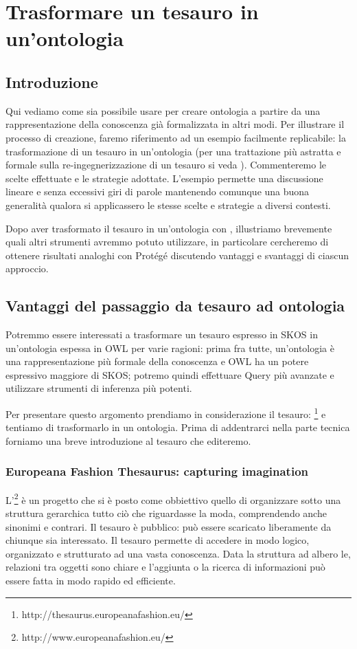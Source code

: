 \chapter{Trasformare un tesauro in un'ontologia}\label{ch3}
\section{Introduzione}
Qui vediamo come sia possibile usare \cduce per creare ontologia a partire da una rappresentazione della conoscenza già formalizzata in altri modi. Per illustrare il processo di creazione, faremo riferimento ad un esempio facilmente replicabile: la trasformazione di un tesauro in un'ontologia (per una trattazione più astratta e formale sulla re-ingegnerizzazione di un tesauro si veda \cite{re_engineeringThesaurus}). Commenteremo le scelte effettuate e le strategie adottate. L'esempio permette una discussione lineare e senza eccessivi giri di parole mantenendo comunque una buona generalità qualora si applicassero le stesse scelte e strategie a diversi contesti.

Dopo aver trasformato il tesauro in un'ontologia con \cduce, illustriamo brevemente quali altri strumenti avremmo potuto utilizzare, in particolare cercheremo di ottenere risultati analoghi con Protégé discutendo vantaggi e svantaggi di ciascun approccio.

\section{Vantaggi del passaggio da tesauro ad ontologia}
Potremmo essere interessati a trasformare un tesauro espresso in SKOS in un'ontologia espessa in OWL per varie ragioni: prima fra tutte, un'ontologia è una rappresentazione più formale della conoscenza e OWL ha un potere espressivo maggiore di SKOS; potremo quindi effettuare Query più avanzate e utilizzare strumenti di inferenza più potenti.

Per presentare questo argomento prendiamo in considerazione il tesauro: \footnote{http://thesaurus.europeanafashion.eu/} e tentiamo di trasformarlo in un ontologia. Prima di addentrarci nella parte tecnica forniamo una breve introduzione al tesauro che editeremo.
\subsection{Europeana Fashion Thesaurus: capturing imagination}
L'\footnote{http://www.europeanafashion.eu/} è un progetto che si è posto come obbiettivo quello di organizzare sotto una struttura gerarchica tutto ciò che riguardasse la moda, comprendendo anche sinonimi e contrari. Il tesauro è pubblico: può essere scaricato liberamente da chiunque sia interessato. Il tesauro permette di accedere in modo logico, organizzato e strutturato ad una vasta conoscenza. Data la struttura ad albero le, relazioni tra oggetti sono chiare e l'aggiunta o la ricerca di informazioni può essere fatta in modo rapido ed efficiente.
